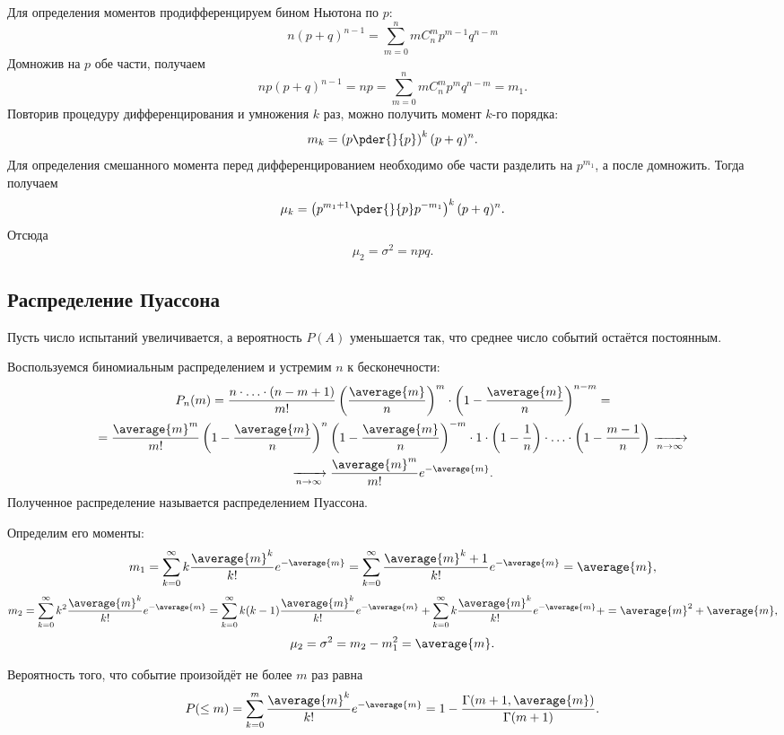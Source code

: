     Для определения моментов продифференцируем бином Ньютона по \( p \):
    \[
        n(p+q)^{n-1} = \sum_{m=0}^n m C_n^m p^{m-1} q^{n-m}
    \]
    Домножив на \( p \) обе части, получаем
    \[
        np(p+q)^{n-1} = np = \sum_{m=0}^n m C_n^m p^m q^{n-m} = m_1.
    \]
    Повторив процедуру дифференцирования и умножения \( k \) раз, можно получить
    момент \( k \)-го порядка:
    \[
        m_k = \left( p \pder{}{p} \right)^k (p+q)^n.
    \]
    Для определения смешанного момента перед дифференцированием необходимо обе
    части разделить на \( p^{m_1} \), а после домножить. Тогда получаем
    \[
        \mu_k = \left( p^{m_1+1} \pder{}{p} p^{-m_1} \right)^k (p+q)^n.
    \]
    Отсюда
    \[
        \mu_2 = \sigma^2 = npq.
    \]

\subsection{Распределение Пуассона}

    Пусть число испытаний увеличивается, а вероятность \( P(A) \) уменьшается
    так, что среднее число событий остаётся постоянным.

    Воспользуемся биномиальным распределением и устремим \( n \) к
    бесконечности:
    \begin{gather*}
        P_n(m) = \frac{n\cdot\ldots\cdot(n-m+1)}{m!}
        \left(\frac{\average{m}}{n}\right)^m\cdot
        \left(1 - \frac{\average{m}}{n}\right)^{n-m} =\\
        =\frac{\average{m}^m}{m!}\left(1 - \frac{\average{m}}{n}\right)^n
        \left(1 - \frac{\average{m}}{n}\right)^{-m} \cdot 1 \cdot
        \left(1 - \frac{1}{n}\right)\cdot\ldots\cdot
        \left(1 - \frac{m-1}{n}\right) \xrightarrow[n\to\infty]{}\\
        \xrightarrow[n\to\infty]{} \frac{\average{m}^m}{m!}e^{-\average{m}}.
    \end{gather*}
    Полученное распределение называется распределением Пуассона.

    Определим его моменты:
    \[
        m_1 = \sum_{k=0}^\infty k\frac{\average{m}^k}{k!}e^{-\average{m}} =
        \sum_{k=0}^\infty \frac{\average{m}^k+1}{k!}e^{-\average{m}} =
        \average{m},
    \]
    \[
        m_2 = \sum_{k=0}^\infty k^2\frac{\average{m}^k}{k!}e^{-\average{m}} =
        \sum_{k=0}^\infty k(k-1)\frac{\average{m}^k}{k!}e^{-\average{m}} +
        \sum_{k=0}^\infty k\frac{\average{m}^k}{k!}e^{-\average{m}} +
        = \average{m}^2 + \average{m},
    \]
    \[
        \mu_2 = \sigma^2 = m_2 - m_1^2 = \average{m}.
    \]

    Вероятность того, что событие произойдёт не более \( m \) раз равна
    \[
        P(\le m) = \sum_{k=0}^m \frac{\average{m}^k}{k!}e^{-\average{m}} =
        1 - \frac{\Gamma(m+1, \average{m})}{\Gamma(m+1)}.
    \]
